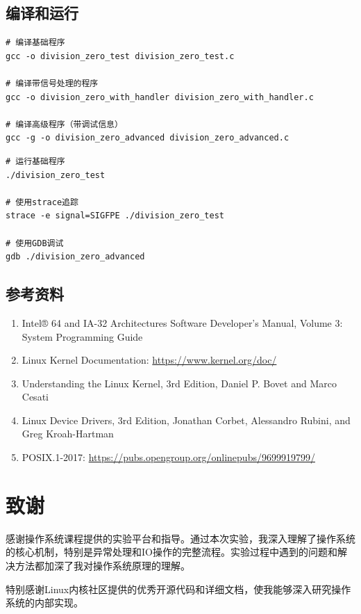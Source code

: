 \documentclass[UTF8,a4paper,12pt]{ctexart}
\begin{document}
\subsection{编译和运行}

\begin{lstlisting}[style=bashstyle,caption={编译命令}]
# 编译基础程序
gcc -o division_zero_test division_zero_test.c

# 编译带信号处理的程序
gcc -o division_zero_with_handler division_zero_with_handler.c

# 编译高级程序（带调试信息）
gcc -g -o division_zero_advanced division_zero_advanced.c
\end{lstlisting}

\begin{lstlisting}[style=bashstyle,caption={运行和调试}]
# 运行基础程序
./division_zero_test

# 使用strace追踪
strace -e signal=SIGFPE ./division_zero_test

# 使用GDB调试
gdb ./division_zero_advanced
\end{lstlisting}

\subsection{参考资料}

\begin{enumerate}[leftmargin=2em]
    \item Intel® 64 and IA-32 Architectures Software Developer's Manual, Volume 3: System Programming Guide
    \item Linux Kernel Documentation: \url{https://www.kernel.org/doc/}
    \item Understanding the Linux Kernel, 3rd Edition, Daniel P. Bovet and Marco Cesati
    \item Linux Device Drivers, 3rd Edition, Jonathan Corbet, Alessandro Rubini, and Greg Kroah-Hartman
    \item POSIX.1-2017: \url{https://pubs.opengroup.org/onlinepubs/9699919799/}
\end{enumerate}

\newpage

\section*{致谢}

感谢操作系统课程提供的实验平台和指导。通过本次实验，我深入理解了操作系统的核心机制，特别是异常处理和IO操作的完整流程。实验过程中遇到的问题和解决方法都加深了我对操作系统原理的理解。

特别感谢Linux内核社区提供的优秀开源代码和详细文档，使我能够深入研究操作系统的内部实现。
\end{document}
